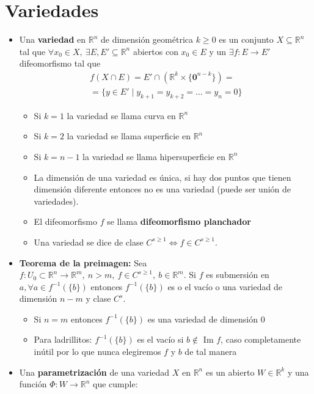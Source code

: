 \documentclass[a4paper,twocolumn]{extarticle}
\newcommand{\R}{\mathbb{R}}
\begin{document}
\section{Variedades}
\begin{itemize}
	\item Una \textbf{variedad} en $\R^n$ de dimensión geométrica $k \geq 0$ es un conjunto $X \subseteq \R^n$ tal que $\forall x_0 \in X,\ \exists E, E' \subseteq \R^n$ abiertos con $x_0 \in E$ y un $\exists f:E \to E'$ difeomorfismo tal que
	\begin{multline*}
		f(X \cap E) = E' \cap (\R^k \times \{\mathbf{0}^{n-k}\}) =\\= \{y \in E' \mid y_{k+1} = y_{k+2} = \dots = y_{n} = 0\}
	\end{multline*}
	\begin{itemize}
		\item Si $k = 1$ la variedad se llama curva en $\R^n$
		\item Si $k = 2$ la variedad se llama superficie en $\R^n$
		\item Si $k = n-1$ la variedad se llama hipersuperficie en $\R^n$
		\item La dimensión de una variedad es única, si hay dos puntos que tienen dimensión diferente entonces no es una variedad (puede ser unión de variedades).
		\item El difeomorfismo $f$ se llama \textbf{difeomorfismo planchador}
		\item Una variedad se dice de clase $C^{s \geq 1} \iff f \in C^{s \geq 1}$.
	\end{itemize}
	\item \textbf{Teorema de la preimagen:} Sea $f:U_0 \subset \R^n \to \R^m,\ n > m,\ f\in C^{s \geq 1},\ b \in \R^{m}$. Si $f$ es submersión en $a, \forall a \in f^{-1}(\{b\})$ entonces $f^{-1}(\{b\})$ es o el vacío o una variedad de dimensión $n - m$ y clase $C^s$.
	\begin{itemize}
		\item Si $n = m$ entonces $f^{-1}(\{b\})$ es una variedad de dimensión $0$
		\item Para ladrillitos: $f^{-1}(\{b\})$ es el vacío si $b \notin \text{ Im } f$, caso completamente inútil por lo que nunca elegiremos $f$ y $b$ de tal manera
	\end{itemize}
	\item Una \textbf{parametrización} de una variedad $X$ en $\R^n$ es un abierto $W \in \R^k$ y una función $\Phi:W \to \R^n$ que cumple:
	\begin{enumerate}

\end{enumerate}
\end{itemize}
\end{document}
